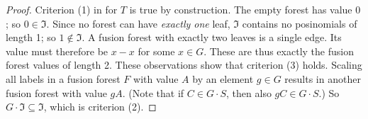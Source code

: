 \documentclass[reqno]{amsart}
\newtheorem{Prop}[Thm]{Proposition}
\theoremstyle{definition}
\theoremstyle{remark}
\newcommand{\abs}[1]{\lvert #1 \rvert}
\newcommand{\Nc}{\mathcal{N}}
\begin{document}
\begin{proof}
    Criterion (1) in  for $T$ is true by construction. 
    The empty forest has value $0$; so $0 \in \mathfrak{I}$.
    Since no forest can have \emph{exactly one} leaf, $\mathfrak{I}$ contains no posinomials of length 1; so $1 \notin \mathfrak{I}$.
    A fusion forest with exactly two leaves is a single edge. Its value must therefore be $x - x$ for some $x \in G$. These are thus exactly the fusion forest values of length 2. These observations show that criterion (3) holds.
    Scaling all labels in a fusion forest $F$ with value $A$ by an element $g \in G$ results in another fusion forest with value $gA$. (Note that if $C \in G \cdot S$, then also $gC \in G \cdot S$.) 
    So $G \cdot \mathfrak{I} \subseteq \mathfrak{I}$, which is criterion (2). 


\end{proof}
\end{document}
